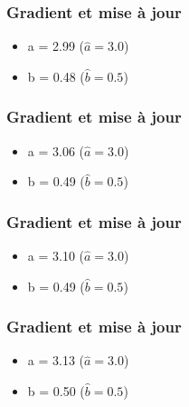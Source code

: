 \begin{frame}
  \frametitle{Gradient et mise à jour}
  \begin{itemize}
  \item a = 2.99 ($\hat{a} = 3.0$)
  \item b = 0.48 ($\hat{b} = 0.5$)
  \end{itemize}
\end{frame}

\begin{frame}
  \frametitle{Gradient et mise à jour}
  \begin{itemize}
  \item a = 3.06 ($\hat{a} = 3.0$)
  \item b = 0.49 ($\hat{b} = 0.5$)
  \end{itemize}
\end{frame}

\begin{frame}
  \frametitle{Gradient et mise à jour}
  \begin{itemize}
  \item a = 3.10 ($\hat{a} = 3.0$)
  \item b = 0.49 ($\hat{b} = 0.5$)
  \end{itemize}
\end{frame}

\begin{frame}
  \frametitle{Gradient et mise à jour}
  \begin{itemize}
  \item a = 3.13 ($\hat{a} = 3.0$)
  \item b = 0.50 ($\hat{b} = 0.5$)
  \end{itemize}
\end{frame}
